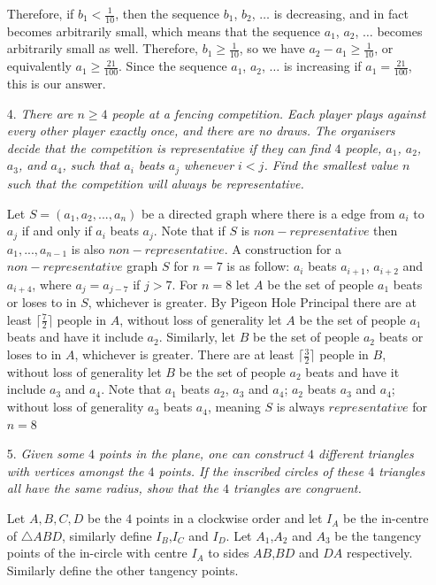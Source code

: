 \documentclass{article}
\begin{document}
\begin{enumerate}
Therefore, if $b_1 < \frac{1}{10}$, then the sequence $b_1$, $b_2$, $\dots$ is decreasing, and in fact becomes arbitrarily small, which means that the sequence $a_1$, $a_2$, $\dots$ becomes arbitrarily small as well. Therefore, $b_1 \ge \frac{1}{10}$, so we have $a_2 - a_1 \ge \frac{1}{10}$, or equivalently $a_1 \ge \frac{21}{100}$. Since the sequence $a_1$, $a_2$, $\dots$ is increasing if $a_1 = \frac{21}{100}$, this is our answer.

\medskip
\item[4.] %
{\itshape There are $n \ge 4$ people at a fencing competition.
Each player plays against every other player exactly once, and there are no draws.
The organisers decide that the competition is representative if they can find $4$ people, $a_1$, $a_2$, $a_3$, and $a_4$, such that $a_i$ beats $a_j$ whenever $i < j$.
Find the smallest value $n$ such that the competition will always be representative.}

Let $S = (a_1,a_2,...,a_n)$ be a directed graph where there is a edge from $a_i$ to $a_j$ if and only if $a_i$ beats $a_j$. Note that if $S$ is $non-representative$ then $a_1,...,a_{n-1}$ is also $non-representative$. A construction for a $non-representative$ graph $S$ for $n=7$ is as follow: $a_i$ beats $a_{i+1}$, $a_{i+2}$ and $a_{i+4}$, where $a_j = a_{j-7}$ if $j>7$. For $n=8$ let $A$ be the set of people $a_1$ beats or loses to in $S$, whichever is greater. By Pigeon Hole Principal there are at least $\lceil{\frac{7}{2}}\rceil$ people in $A$, without loss of generality let $A$ be the set of people $a_1$ beats and have it include $a_2$. Similarly, let $B$ be the set of people $a_2$ beats or loses to in $A$, whichever is greater. There are at least $\lceil{\frac{3}{2}}\rceil$ people in $B$, without loss of generality let $B$ be the set of people $a_2$ beats and have it include $a_3$ and $a_4$. Note that $a_1$ beats $a_2$, $a_3$ and $a_4$; $a_2$ beats $a_3$ and $a_4$; without loss of generality $a_3$ beats $a_4$, meaning $S$ is always $representative$ for $n=8$


\medskip
\item[5.] %
{\itshape Given some $4$ points in the plane, one can construct $4$ different triangles with vertices amongst the $4$ points.
If the inscribed circles of these $4$ triangles all have the same radius, show that the $4$ triangles are congruent. }

Let $A,B,C,D$ be the $4$ points in a clockwise order and let $I_A$ be the in-centre of $\triangle ABD$, similarly define $I_B$,$I_C$ and $I_D$. Let $A_1$,$A_2$ and $A_3$ be the tangency points of the in-circle with centre $I_A$ to sides $AB$,$BD$ and $DA$ respectively. Similarly define the other tangency points. 


\end{enumerate}
\end{document}
